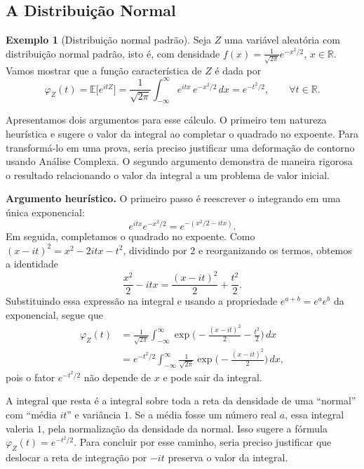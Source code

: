 \documentclass[12pt,portuguese]{article}
\theoremstyle{definition}
\newtheorem{example}[example]{Exemplo}
\theoremstyle{plainexercise}
\theoremstyle{starredexercise}
\theoremstyle{definition}
\begin{document}
\subsection{A Distribuição Normal}\label{subsec:exemplo-normal}

\begin{example}[Distribuição normal padrão]\label{ex:normal}
Seja $Z$ uma variável aleatória com distribuição normal padrão, isto é, com
densidade $f(x)=\frac{1}{\sqrt{2\pi}}e^{-x^2/2}$, $x\in\mathbb{R}$. Vamos mostrar que a
função característica de $Z$ é dada por
\[
\varphi_Z(t)=\mathbb{E}\bigl[e^{itZ}\bigr]
=
\frac{1}{\sqrt{2\pi}}
\int_{-\infty}^{\infty}e^{itx}\,e^{-x^2/2}\,dx
=e^{-t^2/2}, \qquad \forall t\in\mathbb{R}.
\]

Apresentamos dois argumentos para esse cálculo. O primeiro tem natureza
heurística e sugere o valor da integral ao completar o quadrado no expoente.
Para transformá-lo em uma prova, seria preciso justificar uma deformação de
contorno usando Análise Complexa. O segundo argumento demonstra de maneira rigorosa o resultado
relacionando o valor da integral a um problema de valor inicial.
\end{example}

\smallskip
\noindent\textbf{Argumento heurístico.}
O primeiro passo é reescrever o integrando em uma única exponencial:
\[
e^{itx}e^{-x^2/2}=e^{-(x^2/2-itx)}.
\]
Em seguida, completamos o quadrado no expoente.
Como $(x-it)^2=x^2-2itx-t^2$, dividindo por $2$ e reorganizando os termos,
obtemos a identidade
\[
\frac{x^2}{2}-itx=\frac{(x-it)^2}{2}+\frac{t^2}{2}.
\]
Substituindo essa expressão na integral e usando a propriedade
$e^{a+b}=e^ae^b$ da exponencial, segue que
\begin{align*}
\varphi_Z(t)
&=
\frac{1}{\sqrt{2\pi}}
\int_{-\infty}^{\infty}
\exp\biggl(-\frac{(x-it)^2}{2}-\frac{t^2}{2}\biggr)\,dx
\\[0.3cm]
&=e^{-t^2/2}\int_{-\infty}^{\infty}\frac{1}{\sqrt{2\pi}}
\exp\biggl(-\frac{(x-it)^2}{2}\biggr)\,dx ,
\end{align*}
pois o fator $e^{-t^2/2}$ não depende de $x$ e pode sair da integral.

A integral que resta é a integral sobre toda a reta da densidade de uma ``normal''
com ``média $it$'' e variância $1$. Se a média fosse um número real $a$, essa
integral valeria $1$, pela normalização da densidade da normal.
Isso sugere a fórmula $\varphi_Z(t)=e^{-t^2/2}$. Para concluir por esse
caminho, seria preciso justificar que deslocar a reta de integração por
$-it$ preserva o valor da integral.
\end{document}
